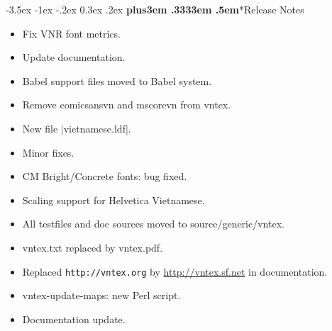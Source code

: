 \documentclass[a4paper,11pt]{article}
\makeatletter
\renewcommand\section{\@startsection {section}{1}{\z@}%
                                   {-3.5ex \@plus -1ex \@minus -.2ex}%
                                   {0.3ex \@plus.2ex}%
                                   {\normalfont\Large\bfseries   
                                     \rightskip\z@ plus3em
                                     \spaceskip.3333em
                                     \xspaceskip.5em\color[named]{BrickRed}}}
\def\pkg#1{{\sffamily#1}}
\makeatother
\begin{document}
\section*{Release Notes}
\vspace*{6.666mm}
\begin{releasenotes}

\begin{itemize}
\item Fix VNR font metrics.
\item Update documentation.
\end{itemize}

\begin{itemize}
\item Babel support files moved to Babel system.
\end{itemize}

\begin{itemize}
\item Remove \pkg{comicsansvn} and \pkg{mscorevn} from \pkg{vntex}.
\item New file |vietnamese.ldf|.
\end{itemize}

\begin{itemize}
\item Minor fixes.
\end{itemize}

\begin{itemize}
\item CM Bright/Concrete fonts: bug fixed.
\item Scaling support for Helvetica Vietnamese.
\item All testfiles and doc sources moved to source/generic/vntex.
\item vntex.txt replaced by vntex.pdf.
\end{itemize}

\begin{itemize}
\item Replaced \texttt{http://vntex.org} by \url{http://vntex.sf.net}
  in documentation.
\end{itemize}

\begin{itemize}
\item vntex-update-maps: new Perl script.
\item Documentation update.
\end{itemize}


\end{releasenotes}
\end{document}

